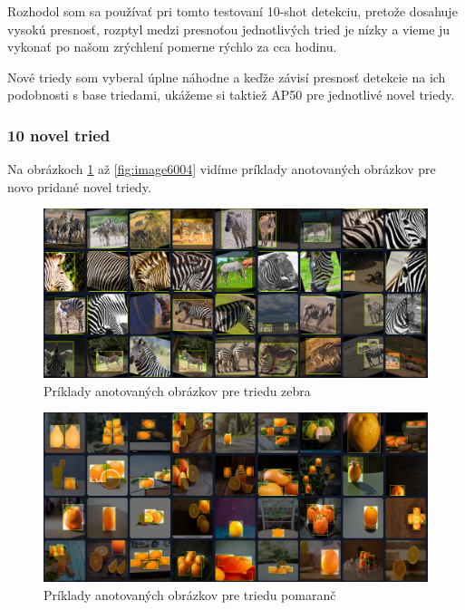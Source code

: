 Rozhodol som sa používať pri tomto testovaní 10-shot detekciu, pretože dosahuje  vysokú presnosť, rozptyl medzi presnoťou jednotlivých tried je nízky a vieme ju vykonať po našom zrýchlení pomerne rýchlo za cca hodinu. 

Nové triedy som vyberal úplne náhodne a keďže závisí presnosť detekcie na ich podobnosti s base triedami, ukážeme si taktiež AP50 pre jednotlivé novel triedy.

\subsubsection{10 novel tried}

Na obrázkoch \ref{fig:image6001} až \ref{fig:image6004} vidíme príklady anotovaných obrázkov pre novo pridané novel triedy.

\begin{figure}[H]
\centering
\includegraphics[width=\textwidth]{images/zebra_example_annotations.png}
\caption{Príklady anotovaných obrázkov pre triedu zebra}
\label{fig:image6001}
\end{figure}

\begin{figure}[H]
\centering
\includegraphics[width=\textwidth]{images/orange_example_annotations.png}
\caption{Príklady anotovaných obrázkov pre triedu pomaranč}
\label{fig:image6002}
\end{figure}

